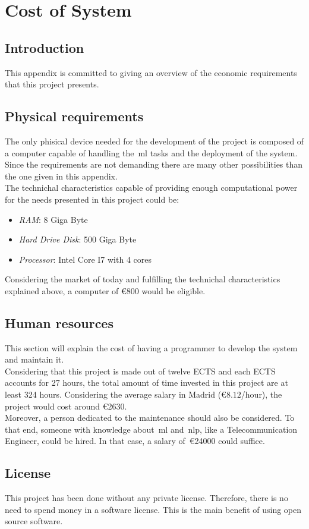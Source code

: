 \appendix
\chapter{Cost of System}
\section{Introduction}
This appendix is committed to giving an overview of the economic requirements that this project presents.
\section{Physical requirements}
The only phisical device needed for the development of the project is composed of a computer capable of handling the~\ac{ml} tasks and the deployment of the system. Since the requirements are not demanding there are many other possibilities than the one given in this appendix.\\
The technichal characteristics capable of providing enough computational power for the needs presented in this project could be:
\begin{itemize}
	\item \textit{RAM}: 8 Giga Byte
	\item \textit{Hard Drive Disk}: 500 Giga Byte
	\item \textit{Processor}: Intel Core I7 with 4 cores
\end{itemize}
Considering the market of today and fulfilling the technichal characteristics explained above, a computer of \euro{800} would be eligible.
\section{Human resources}
This section will explain the cost of having a programmer to develop the system and maintain it.\\
Considering that this project is made out of twelve ECTS and each ECTS accounts for 27 hours, the total amount of time invested in this project are at least 324 hours. Considering the average salary in Madrid (\euro{$8.12$}/hour), the project would cost around \euro{2630}.\\
Moreover, a person dedicated to the maintenance should also be considered. To that end, someone with knowledge about~\ac{ml} and~\ac{nlp}, like a Telecommunication Engineer, could be hired. In that case, a salary of~\euro{24000} could suffice.
\section{License}
This project has been done without any private license. Therefore, there is no need to spend money in a software license. This is the main benefit of using open source software. 